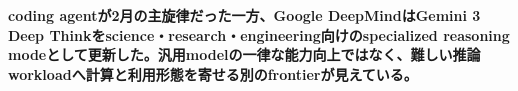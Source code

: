 \noindent\textbf{coding agentが2月の主旋律だった一方、Google DeepMindはGemini 3 Deep Thinkをscience・research・engineering向けのspecialized reasoning modeとして更新した。汎用modelの一律な能力向上ではなく、難しい推論workloadへ計算と利用形態を寄せる別のfrontierが見えている。}\autocite{src-dd5d9b8662f3}

